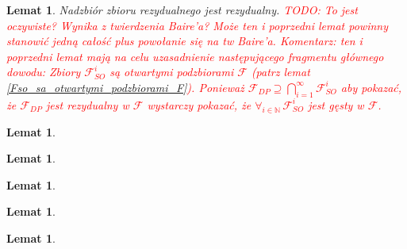 \documentclass[licencjacka]{pwr_wmat_praca_dyplomowa}
\theoremstyle{plain}
\numberwithin{theorem}{chapter}
\newtheorem{lemma}[theorem]{Lemat}
\theoremstyle{definition}
\numberwithin{theorem}{chapter}
\begin{document}
\begin{lemma}
\label{nadzbior_rezydualnego_jest_rezydualny}
Nadzbiór zbioru rezydualnego jest rezydualny.
\textcolor{red}{TODO: To jest oczywiste? Wynika z twierdzenia Baire'a? Może ten i poprzedni lemat powinny stanowić jedną całość plus powołanie się na tw Baire'a. Komentarz: ten i poprzedni lemat mają na celu uzasadnienie następującego fragmentu głównego dowodu: Zbiory $\mathcal{F}_{SO}^i$ są otwartymi podzbiorami $\mathcal{F}$ (patrz lemat \ref{Fso_sa_otwartymi_podzbiorami_F}). Ponieważ $\mathcal{F}_{DP} \supseteq \bigcap_{i=1}^{\infty} \mathcal{F}_{SO}^i$ aby pokazać, że $\mathcal{F}_{DP}$ jest rezydualny w $\mathcal{F}$ wystarczy pokazać, że $\forall_{i \in \mathbb{N}} \, \mathcal{F}_{SO}^i$ jest gęsty w $\mathcal{F}$.}

\end{lemma}



\begin{lemma}
\label{obraz_x0_razy_ab_przez_iterate_G_rowna_sie_x0y0}
\end{lemma}



\begin{lemma}
\label{obraz_przez_iterate_kazdego_dostatecznie_bliskiego_G_zawiera_sie_w_x0_razy_ab}
\end{lemma}



\begin{lemma}
\label{na_mocy_lematu_4_mozemy_dostac_odwzorowanie_H_z_wloknami_scisle_rosnacymi}
\end{lemma}



\begin{lemma}
\label{y0_rozne_od_0_i_1_implikuje_pr2Hrx0y0_rozne_od_0_i_1}
\end{lemma}



\begin{lemma}
\label{przypadek1_daje_odwzorowanie_G_bliskie_H}
\end{lemma}
\end{document}
